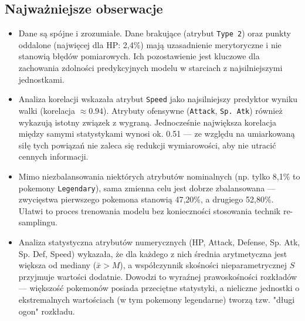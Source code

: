 \documentclass[12pt, a4paper]{report}
\begin{document}
\subsection{Najważniejsze obserwacje}
\begin{itemize}
    \item Dane są spójne i zrozumiałe. Dane brakujące (atrybut \texttt{Type 2}) oraz punkty oddalone (najwięcej dla HP: 2,4\%) mają uzasadnienie merytoryczne i nie stanowią błędów pomiarowych. Ich pozostawienie jest kluczowe dla zachowania zdolności predykcyjnych modelu w starciach z najsilniejszymi jednostkami.
    \item Analiza korelacji wskazała atrybut \texttt{Speed} jako najsilniejszy predyktor wyniku walki (korelacja $\approx 0.94$). Atrybuty ofensywne (\texttt{Attack}, \texttt{Sp. Atk}) również wykazują istotny związek z wygraną. Jednocześnie największa korelacja między samymi statystykami wynosi ok. 0.51 — ze względu na umiarkowaną siłę tych powiązań nie zaleca się redukcji wymiarowości, aby nie utracić cennych informacji.
    \item Mimo niezbalansowania niektórych atrybutów nominalnych (np. tylko 8,1\% to pokemony \texttt{Legendary}), sama zmienna celu jest dobrze zbalansowana — zwycięstwa pierwszego pokemona stanowią 47,20\%, a drugiego 52,80\%. Ułatwi to proces trenowania modelu bez konieczności stosowania technik re-samplingu.


    
    \item Analiza statystyczna atrybutów numerycznych (HP, Attack, Defense, Sp. Atk, Sp. Def, Speed) wykazała, że dla każdego z nich średnia arytmetyczna jest większa od mediany ($\bar{x} > M$), a współczynnik skośności nieparametrycznej $S$ przyjmuje wartości dodatnie. Dowodzi to wyraźnej prawoskośności rozkładów — większość pokemonów posiada przeciętne statystyki, a nieliczne jednostki o ekstremalnych wartościach (w tym pokemony legendarne) tworzą tzw. "długi ogon" rozkładu.
    
\end{itemize}

\end{document}
